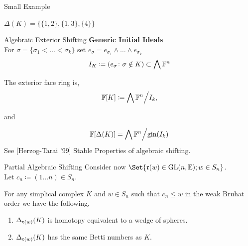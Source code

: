 \documentclass[9pt]{beamer}
\theoremstyle{definition}
\begin{document}
\begin{frame}[fragile]{Small Example}
\begin{example}
  $ \Delta(K) = \{\{1, 2\}, \{1, 3\}, \{4\}\}$
  \end{example}
\end{frame}


\begin{frame}[fragile]{Algebraic Exterior Shifting}
  \textbf{Generic Initial Ideals}\\
  For $\sigma = \{\sigma_1 < \ldots < \sigma_k\}$ set $e_{\sigma} = e_{\sigma_1} \wedge \ldots \wedge e_{\sigma_k}$ 
  \[
    I_K \coloneqq (e_\sigma\colon \sigma \notin K) \subset \bigwedge {\mathbb F}^n 
  \]

  The exterior face ring is,
  \[
    {\mathbb F}[K] \coloneq {\bigwedge {\mathbb F}^n}\Big/{ I_k},
  \]

  and

  \[
    {\mathbb F}[\Delta(K)] = {\bigwedge {\mathbb F}^n}\Big/{ \text{gin}(I_k)}
  \]
  See [Herzog-Tarai '99] Stable Properties of algebraic shifting.
\end{frame}


\begin{frame}[fragile]{Partial Algebraic Shifting }
  Consider now $\Set{\frR(w) \in \GL(n, \EE); w \in S_n}$.\\
  Let $c_n \coloneqq (1 \ldots n) \in S_n$.

  \begin{theorem}
    For any simplical complex $K$ and $w \in S_n$ such that $c_n \leq w$ in the weak Bruhat order we have the following,
    \begin{enumerate}
    \item $\Delta_{{\mathfrak r}(w)}(K)$ is homotopy equivalent to a wedge of spheres.
    \item $\Delta_{{\mathfrak r}(w)}(K)$ has the same Betti numbers as $K$.
    \end{enumerate}

  \end{theorem}
\end{frame}
\end{document}
